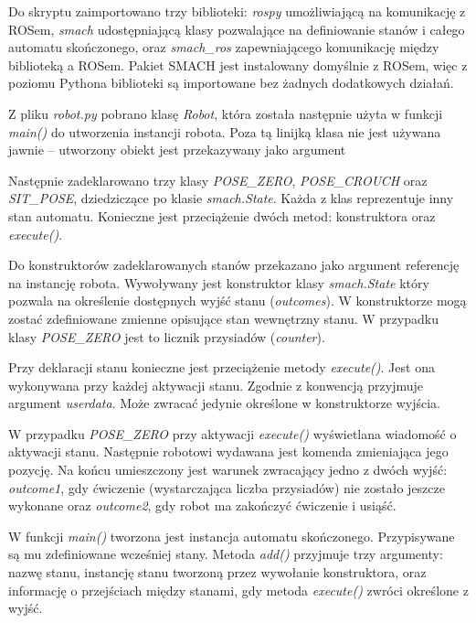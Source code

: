 Do skryptu zaimportowano trzy biblioteki: \textit{rospy} umożliwiającą na komunikację z ROSem, \textit{smach} udostępniającą klasy pozwalające na definiowanie stanów i całego automatu skończonego, oraz \textit{smach\_ros} zapewniającego komunikację między biblioteką a ROSem. Pakiet SMACH jest instalowany domyślnie z ROSem, więc z poziomu Pythona biblioteki są importowane bez żadnych dodatkowych działań. 


Z pliku \textit{robot.py} pobrano klasę \textit{Robot}, która została następnie użyta w funkcji \textit{main()} do utworzenia instancji robota. Poza tą linijką klasa nie jest używana jawnie – utworzony obiekt jest przekazywany jako argument 



Następnie zadeklarowano trzy klasy \textit{POSE\_ZERO}, \textit{POSE\_CROUCH} oraz \textit{SIT\_POSE}, dziedziczące po klasie \textit{smach.State}. Każda z klas reprezentuje inny stan automatu. Konieczne jest przeciążenie dwóch metod: konstruktora oraz \textit{execute()}.

Do konstruktorów zadeklarowanych stanów przekazano jako argument referencję na instancję robota. 
Wywoływany jest konstruktor klasy \textit{smach.State} który pozwala na określenie dostępnych wyjść stanu (\textit{outcomes}). W konstruktorze mogą zostać zdefiniowane zmienne opisujące stan wewnętrzny stanu. W przypadku klasy \textit{POSE\_ZERO} jest to licznik przysiadów (\textit{counter}).

Przy deklaracji stanu konieczne jest przeciążenie metody \textit{execute()}. Jest ona wykonywana przy każdej aktywacji stanu. Zgodnie z konwencją przyjmuje argument \textit{userdata}. Może zwracać jedynie określone w konstruktorze wyjścia. 

W przypadku \textit{POSE\_ZERO} przy aktywacji \textit{execute()} wyświetlana wiadomość o aktywacji stanu. Następnie robotowi wydawana jest komenda zmieniająca jego pozycję. Na końcu umieszczony jest warunek zwracający jedno z dwóch wyjść: \textit{outcome1}, gdy ćwiczenie (wystarczająca liczba przysiadów) nie zostało jeszcze wykonane oraz \textit{outcome2}, gdy robot ma zakończyć ćwiczenie i usiąść.



W funkcji \textit{main()} tworzona jest instancja automatu skończonego. Przypisywane są mu zdefiniowane wcześniej stany. Metoda \textit{add()} przyjmuje trzy argumenty: nazwę stanu, instancję stanu tworzoną przez wywołanie konstruktora, oraz informację o przejściach między stanami, gdy metoda \textit{execute()} zwróci określone z wyjść.


